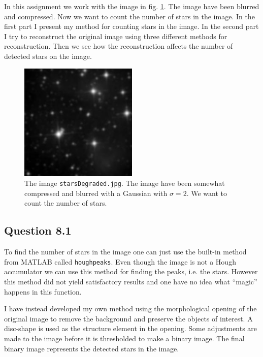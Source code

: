\documentclass[a4paper, 10pt, final]{article}
\title{\mytitle}
\subtitle{\mysubtitle}
\author{\myauthor{} - \mymail}
\date{\mydate}
\begin{document}
\maketitle

In this assignment we work with the image in fig. \ref{starsDegraded}.
The image have been blurred and compressed. Now we want to count the
number of stars in the image. In the first part I present my method for
counting stars in the image. In the second part I try to reconstruct the
original image using three different methods for reconstruction. Then we
see how the reconstruction affects the number of detected stars on the
image.

\begin{figure}[h!]
    \centering
    \includegraphics[width=0.5\textwidth]{images/starsDegraded}
    \caption{The image \texttt{starsDegraded.jpg}. The image have been
    somewhat compressed and blurred with a Gaussian with $\sigma = 2$.
    We want to count the number of stars.}
    \label{starsDegraded}
\end{figure}

\subsection*{Question 8.1}
To find the number of stars in the image one can just use the built-in
method from MATLAB called \texttt{houghpeaks}. Even though the image is
not a Hough accumulator we can use this method for finding the peaks,
i.e. the stars. However this method did not yield satisfactory results
and one have no idea what ``magic'' happens in this function.

I have instead developed my own method using the morphological opening
of the original image to remove the background and preserve the objects
of interest. A disc-shape is used as the structure element in the
opening. Some adjustments are made to the image before it is thresholded
to make a binary image. The final binary image represents the detected
stars in the image.
\end{document}
